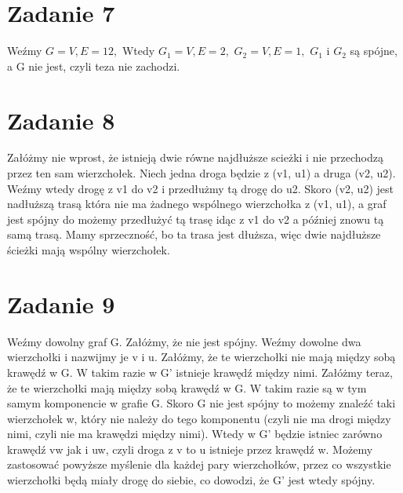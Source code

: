 \documentclass[12pt]{article}
\begin{document}
\section{Zadanie 7}
Weźmy $G = {V, E} = {{1 2}, {}}$
Wtedy
$G_1 = {V, E} = {{2}, {}}$
$G_2 = {V, E} = {{1}, {}}$
$G_1$ i $G_2$ są spójne, a G nie jest, czyli teza nie zachodzi.





\section{Zadanie 8}
Załóżmy nie wprost, że istnieją dwie równe najdłuższe scieżki i nie przechodzą przez ten sam wierzchołek. Niech jedna droga będzie z (v1, u1) a druga (v2, u2). Weźmy wtedy drogę z v1 do v2 i przedłużmy tą drogę do u2. Skoro (v2, u2) jest nadłuższą trasą która nie ma żadnego wspólnego wierzchołka z (v1, u1), a graf jest spójny do możemy przedłużyć tą trasę idąc z v1 do v2 a później znowu tą samą trasą. 
Mamy sprzeczność, bo ta trasa jest dłuższa, więc dwie najdłuższe ścieżki mają wspólny wierzchołek.

\section{Zadanie 9}
Weźmy dowolny graf G. Załóżmy, że nie jest spójny. Weźmy dowolne dwa wierzchołki i nazwijmy je v i u. Załóżmy, że te wierzchołki nie mają między sobą krawędź w G. W takim razie w G' istnieje krawędź między nimi. 
Załóżmy teraz, że te wierzchołki mają między sobą krawędź w G. W takim razie są w tym samym komponencie w grafie G. Skoro G nie jest spójny to możemy znaleźć taki wierzchołek w, który nie należy do tego komponentu (czyli nie ma drogi między nimi, czyli nie ma krawędzi między nimi). Wtedy w G' będzie istniec zarówno krawędź vw jak i uw, czyli droga z v to u istnieje przez krawędź w. Możemy zastosować powyższe myślenie dla każdej pary wierzchołków, przez co wszystkie wierzchołki będą miały drogę do siebie, co dowodzi, że G' jest wtedy spójny. 






\egroup
\end{document}
